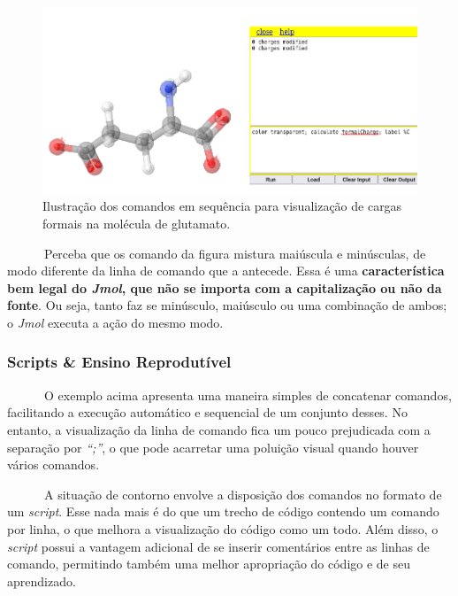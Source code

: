 \documentclass[
  letterpaper,
  DIV=11,
  numbers=noendperiod]{scrreprt}
\begin{document}
\begin{figure}[H]

{\centering \includegraphics{gluFormal.png}

}

\caption{Ilustração dos comandos em sequência para visualização de
cargas formais na molécula de glutamato.}

\end{figure}%

~~~~~~Perceba que os comando da figura mistura maiúscula e minúsculas,
de modo diferente da linha de comando que a antecede. Essa é uma
\textbf{característica bem legal do \emph{Jmol}, que não se importa com
a capitalização ou não da fonte}. Ou seja, tanto faz se minúsculo,
maiúsculo ou uma combinação de ambos; o \emph{Jmol} executa a ação do
mesmo modo.

\subsubsection{Scripts \& Ensino
Reprodutível}\label{scripts-ensino-reprodutuxedvel}

~~~~~~O exemplo acima apresenta uma maneira simples de concatenar
comandos, facilitando a execução automático e sequencial de um conjunto
desses. No entanto, a visualização da linha de comando fica um pouco
prejudicada com a separação por \emph{``;''}, o que pode acarretar uma
poluição visual quando houver vários comandos.

~~~~~~A situação de contorno envolve a disposição dos comandos no
formato de um \emph{script}. Esse nada mais é do que um trecho de código
contendo um comando por linha, o que melhora a visualização do código
como um todo. Além disso, o \emph{script} possui a vantagem adicional de
se inserir comentários entre as linhas de comando, permitindo também uma
melhor apropriação do código e de seu aprendizado.
\end{document}
